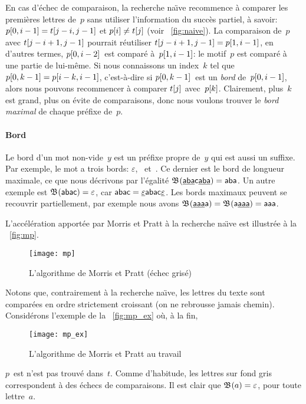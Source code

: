 En cas d'échec de comparaison, la recherche na\"{\i}ve recommence à
comparer les premières lettres de~\(p\) sans utiliser l'information du
succès partiel, à savoir: \({p}[{0,i-1}] = {t}[{j-i,j-1}]\) et
\({p}[{i}] \neq {t}[{j}]\) (voir \fig~\vref{fig:naive}). La
comparaison de~\(p\) avec \({t}[{j-i+1,j-1}]\) pourrait réutiliser
\({t}[{j-i+1,j-1}] = {p}[{1,i-1}]\), en d'autres termes,
\({p}[{0,i-2}]\)~est comparé à~\({p}[{1,i-1}]\): le motif~\(p\)
est comparé à une partie de lui-même. Si nous connaissons un
index~\(k\) tel que \({p}[{0,k-1}] = {p}[{i-k,i-1}]\),
c'est-à-dire si \({p}[{0,k-1}]\)~est un \emph{bord}
de~\({p}[{0,i-1}]\), alors nous pouvons recommencer à comparer
\({t}[{j}]\) avec~\({p}[{k}]\). Clairement, plus~\(k\) est grand,
plus on évite de comparaisons, donc nous voulons trouver le \emph{bord
  maximal} de chaque préfixe de~\(p\).

\paragraph{Bord}

Le bord d'un mot non-vide~\(y\) est un préfixe propre de~\(y\) qui est
aussi un suffixe. Par exemple, le mot  a trois bords:
\(\varepsilon\), ~et~. Ce dernier est le bord de
longueur maximale, ce que nous décrivons par l'égalité
\(\mathfrak{B}^{}(\underline{\textsf{aba}}\textsf{c}\underline{\textsf{aba}}) =
\textsf{aba}\). Un autre exemple est \(\mathfrak{B}^{}(\textsf{abac}) =
\varepsilon\), car \(\textsf{abac} =
\underline{\varepsilon}\textsf{abac}\underline{\varepsilon}\). Les bords
maximaux peuvent se recouvrir partiellement, par exemple nous avons
\(\mathfrak{B}^{}(\underline{\textsf{aaa}}\textsf{a}) =
\mathfrak{B}^{}(\textsf{a}\underline{\textsf{aaa}}) = \textsf{aaa}\).

L'accélération apportée par Morris et Pratt à la recherche na\"{\i}ve
est illustrée à la \fig~\vref{fig:mp}.
\begin{figure}[b]
\centering
\texttt{[image: mp]}
\caption{L'algorithme de Morris et Pratt (échec grisé)}
\label{fig:mp}
\end{figure}
Notons que, contrairement à la recherche na\"{\i}ve, les lettres du
texte sont comparées en ordre strictement croissant (on ne rebrousse
jamais chemin). Considérons l'exemple de la \fig~\vref{fig:mp_ex} où,
à la fin,
\begin{figure}[t]
\centering
\texttt{[image: mp\_ex]}
\caption{L'algorithme de Morris et Pratt au travail}
\label{fig:mp_ex}
\end{figure}
\(p\)~est n'est pas trouvé dans~\(t\). Comme d'habitude, les lettres
sur fond gris correspondent à des échecs de comparaisons. Il est clair
que \(\mathfrak{B}^{}(a) = \varepsilon\), pour toute lettre~\(a\).

